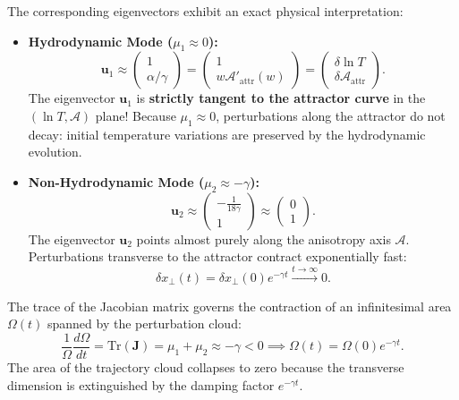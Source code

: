 \documentclass[11pt,a4paper]{article}
\begin{document}
The corresponding eigenvectors exhibit an exact physical interpretation:
\begin{itemize}
    \item \textbf{Hydrodynamic Mode ($\mu_1 \approx 0$):}
    \begin{equation}
        \mathbf{u}_1 \approx \begin{pmatrix} 1 \\ \alpha/\gamma \end{pmatrix} = \begin{pmatrix} 1 \\ w \mathcal{A}'_{\mathrm{attr}}(w) \end{pmatrix} = \begin{pmatrix} \delta \ln T \\ \delta\mathcal{A}_{\mathrm{attr}} \end{pmatrix}.
        \label{eq:eigenvector_1}
    \end{equation}
    The eigenvector $\mathbf{u}_1$ is \textbf{strictly tangent to the attractor curve} in the $(\ln T, \mathcal{A})$ plane! Because $\mu_1 \approx 0$, perturbations along the attractor do not decay: initial temperature variations are preserved by the hydrodynamic evolution.
    \item \textbf{Non-Hydrodynamic Mode ($\mu_2 \approx -\gamma$):}
    \begin{equation}
        \mathbf{u}_2 \approx \begin{pmatrix} -\frac{1}{18\gamma} \\ 1 \end{pmatrix} \approx \begin{pmatrix} 0 \\ 1 \end{pmatrix}.
        \label{eq:eigenvector_2}
    \end{equation}
    The eigenvector $\mathbf{u}_2$ points almost purely along the anisotropy axis $\mathcal{A}$. Perturbations transverse to the attractor contract exponentially fast:
    \begin{equation}
        \delta x_\perp(t) = \delta x_\perp(0) e^{-\gamma t} \xrightarrow{t \to \infty} 0.
    \end{equation}
\end{itemize}

\begin{tcolorbox}[colback=blue!5!white,colframe=blue!75!black,title=\textbf{Phase-Space Volume Contraction (Liouville's Theorem)}]
The trace of the Jacobian matrix governs the contraction of an infinitesimal area $\Omega(t)$ spanned by the perturbation cloud:
\begin{equation}
    \frac{1}{\Omega}\frac{d\Omega}{dt} = \mathrm{Tr}(\mathbf{J}) = \mu_1 + \mu_2 \approx -\gamma < 0 \implies \Omega(t) = \Omega(0) e^{-\gamma t}.
\end{equation}
The area of the trajectory cloud collapses to zero because the transverse dimension is extinguished by the damping factor $e^{-\gamma t}$.
\end{tcolorbox}
\end{document}
